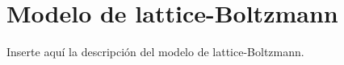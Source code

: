 \chapter{Modelo de lattice-Boltzmann}
\graphicspath{{figs/cap3/}}
\label{cap3}

Inserte aquí la descripción del modelo de lattice-Boltzmann.


